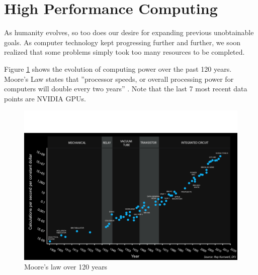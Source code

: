 \documentclass[12pt, openany]{book}
\begin{document}
\section{High Performance Computing}
As humanity evolves, so too does our desire for expanding previous unobtainable goals. As computer technology kept progressing further and further, we soon realized that some problems simply took too many resources to be completed.\par
Figure \ref{fig:moore} shows the evolution of computing power over the past 120 years. Moore's Law states that ''processor speeds, or overall processing power for computers will double every two years'' \cite{moore}. Note that the last 7 most recent data points are NVIDIA GPUs.

\begin{figure}[H]
\centering
  \includegraphics[width=0.6\linewidth]{Resources/Images/moore120.png}
  \caption{Moore's law over 120 years}
  \label{fig:moore}
\end{figure}
\end{document}
